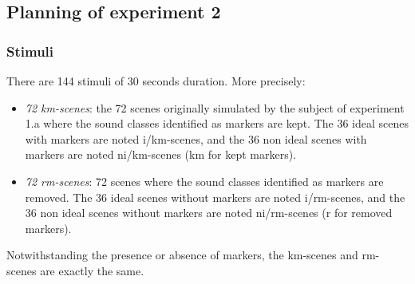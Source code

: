 \documentclass[12pt]{elsarticle}
\newcommand{\ie}{\emph{i.\,e.}}
\newcommand{\cf}{cf.}
\begin{document}
\subsection{Planning of experiment 2}

\subsubsection*{Stimuli}


There are 144 stimuli of 30 seconds duration. More precisely:

\begin{itemize}
\item \emph{72 km-scenes}: the 72 scenes originally simulated by the subject of experiment 1.a where the sound classes identified as markers are kept. The 36 ideal scenes with markers are noted i/km-scenes, and the 36 non ideal scenes with markers are noted ni/km-scenes (km for kept markers).
\item \emph{72 rm-scenes}:  72 scenes where the sound classes identified as markers are removed. The 36 ideal scenes without markers are noted i/rm-scenes, and the 36 non ideal scenes without markers are noted ni/rm-scenes (r for removed markers).
\end{itemize}


Notwithstanding the presence or absence of markers, the km-scenes and rm-scenes are exactly the same.

\end{document}
